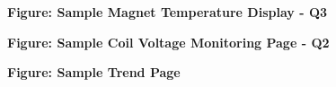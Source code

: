\documentclass[12pt,epsf,here]{article}
\begin{document}
\begin{figure}[htbp]
\centerline{ \epsfysize=10cm  }
\textbf{Figure: Sample Magnet Temperature Display - Q3 }
\end{figure}


\begin{figure}[htbp]
\centerline{ \epsfysize=10cm  }
\textbf{Figure: Sample Coil Voltage Monitoring Page - Q2 }
\end{figure}

\begin{figure}[htbp]
\centerline{ \epsfysize=10cm  }
\textbf{Figure: Sample Trend Page }
\end{figure}
\end{document}
